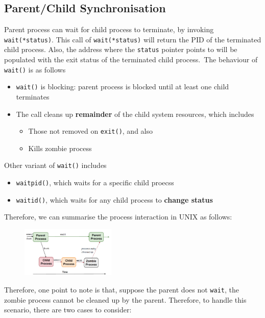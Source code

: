 \documentclass[12pt]{article}
\theoremstyle{definition}
\begin{document}
\subsection{Parent/Child Synchronisation}
Parent process can wait for child process to terminate, by invoking \texttt{wait(*status)}. This call of \texttt{wait(*status)} will return the PID of the terminated child process. Also, the address where the \texttt{status} pointer points to will be populated with the exit status of the terminated child process.\
The behaviour of \texttt{wait()} is as follows
\begin{itemize}
  \item \texttt{wait()} is blocking: parent process is blocked until at least one child terminates
  \item The call cleans up \textbf{remainder} of the child system resources, which includes
  \begin{itemize}
    \item Those not removed on \texttt{exit()}, and also
    \item Kills zombie process
  \end{itemize}
\end{itemize}
Other variant of \texttt{wait()} includes
\begin{itemize}
  \item \texttt{waitpid()}, which waits for a specific child proecss
  \item \texttt{waitid()}, which waits for any child process to \textbf{change status}
\end{itemize}
Therefore, we can summarise the process interaction in UNIX as follows:
\begin{figure}[h]
\centering
\includegraphics[width=0.4\textwidth]{3_1.png}
\end{figure}
Therefore, one point to note is that, suppose the parent does not \texttt{wait}, the zombie process cannot be cleaned up by the parent. Therefore, to handle this scenario, there are two cases to consider:
\end{document}
